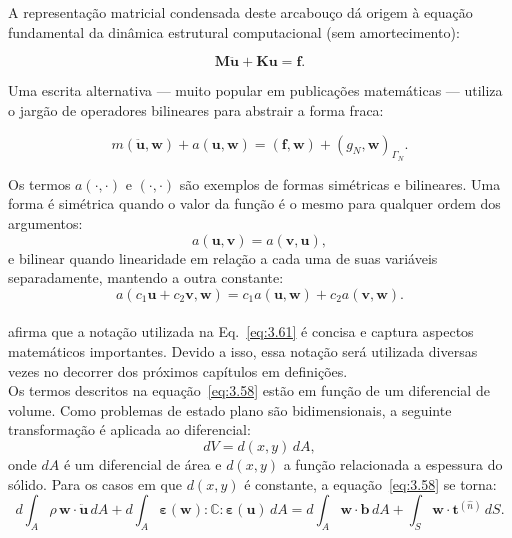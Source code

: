 \indent A representação matricial condensada deste arcabouço dá origem à equação fundamental da dinâmica estrutural computacional (sem amortecimento): 

\begin{equation}
    \mathbf{M} \ddot{\mathbf{u}} + \mathbf{K} \mathbf{u} = \mathbf{f}.
    \label{eq:3.60}
\end{equation}

\indent Uma escrita alternativa — muito popular em publicações matemáticas — utiliza o jargão de operadores bilineares para abstrair a forma fraca: 

\begin{equation}
    m(\ddot{\mathbf{u}}, \mathbf{w}) + a(\mathbf{u}, \mathbf{w}) =  ( \mathbf{f}, \mathbf{w} ) + (g_N,\mathbf{w})_{\Gamma_N}.
    \label{eq:3.61}
\end{equation}

\indent Os termos $a(\cdot,\cdot)$ e $(\cdot,\cdot)$ são exemplos de formas simétricas e bilineares. Uma forma é simétrica quando o valor da função é o mesmo para qualquer ordem dos argumentos: 
$$a(\mathbf{u},\mathbf{v}) = a(\mathbf{v},\mathbf{u}),$$ 
e bilinear quando linearidade em relação a cada uma de suas variáveis separadamente, mantendo a outra constante: 
$$a(c_1 \mathbf{u} + c_2 \mathbf{v}, \mathbf{w}) = c_1 a(\mathbf{u},\mathbf{w}) + c_2 a(\mathbf{v},\mathbf{w}).$$\\
\indent \citet{hughes1987finite} afirma que a notação utilizada na Eq.~\ref{eq:3.61} é concisa e captura aspectos matemáticos importantes. Devido a isso, essa notação será utilizada diversas vezes no decorrer dos próximos capítulos em definições.\\ 
\indent Os termos descritos na equação~\ref{eq:3.58} estão em função de um diferencial de volume. Como problemas de estado plano são bidimensionais, a seguinte transformação é aplicada ao diferencial:
\begin{equation*}
    dV = d(x,y) \, dA,
\end{equation*}
\noindent onde $dA$ é um diferencial de área e $d(x,y)$ a função relacionada a espessura do sólido. Para os casos em que $d(x,y)$ é constante, a equação~\ref{eq:3.58} se torna:
\begin{equation}
    d \int_{A} \rho \, \mathbf{w} \cdot \ddot{\mathbf{u}} \, dA + d \int_{A}  \boldsymbol{\varepsilon}(\mathbf{w}) : \mathbb{C} : \boldsymbol{\varepsilon}(\mathbf{u})  \, dA  
    = d\int_{A} \mathbf{w} \cdot \mathbf{b} \, dA + \int_{S} \mathbf{w} \cdot \mathbf{t}^{(\hat{n})} \, dS.  
    \label{3.58b}  
\end{equation}

